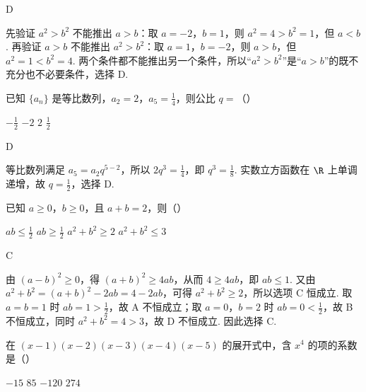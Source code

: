 \begin{answer}
D
\end{answer}

\begin{solution}
先验证 \(a^2>b^2\) 不能推出 \(a>b\)：取 \(a=-2\)，\(b=1\)，则 \(a^2=4>b^2=1\)，但 \(a<b\). 再验证 \(a>b\) 不能推出 \(a^2>b^2\)：取 \(a=1\)，\(b=-2\)，则 \(a>b\)，但 \(a^2=1<b^2=4\). 两个条件都不能推出另一个条件，所以“\(a^2>b^2\)”是“\(a>b\)”的既不充分也不必要条件，选择 D.
\end{solution}

\begin{problem}
已知 \(\{a_{n}\}\) 是等比数列，\(a_{2} = 2\)，\(a_{5} = \frac{1}{4}\)，则公比 \(q =\)（\quad）

\choices
    {\(-\frac{1}{2}\)}
    {\(-2\)}
    {\(2\)}
    {\(\frac{1}{2}\)}
\end{problem}

\begin{answer}
D
\end{answer}

\begin{solution}
等比数列满足 \(a_5=a_2q^{5-2}\)，所以 \(2q^3=\frac14\)，即 \(q^3=\frac18\). 实数立方函数在 \(\R\) 上单调递增，故 \(q=\frac12\)，选择 D.
\end{solution}

\begin{problem}
已知 \(a \geqslant 0\)，\(b \geqslant 0\)，且 \(a + b = 2\)，则（\quad）

\choices
    {\(ab \leqslant \frac{1}{2}\)}
    {\(ab \geqslant \frac{1}{2}\)}
    {\(a^2 + b^2 \geqslant 2\)}
    {\(a^2 + b^2 \leqslant 3\)}
\end{problem}

\begin{answer}
C
\end{answer}

\begin{solution}
由 \((a-b)^2\geqslant0\)，得 \((a+b)^2\geqslant4ab\)，从而 \(4\geqslant4ab\)，即 \(ab\leqslant1\). 又由 \(a^2+b^2=(a+b)^2-2ab=4-2ab\)，可得 \(a^2+b^2\geqslant2\)，所以选项 C 恒成立. 取 \(a=b=1\) 时 \(ab=1>\frac12\)，故 A 不恒成立；取 \(a=0\)，\(b=2\) 时 \(ab=0<\frac12\)，故 B 不恒成立，同时 \(a^2+b^2=4>3\)，故 D 不恒成立. 因此选择 C.
\end{solution}

\begin{problem}
在 \((x - 1)(x - 2)(x - 3)(x - 4)(x - 5)\) 的展开式中，含 \(x^4\) 的项的系数是（\quad）

\choices
    {\(-15\)}
    {\(85\)}
    {\(-120\)}
    {\(274\)}
\end{problem}

